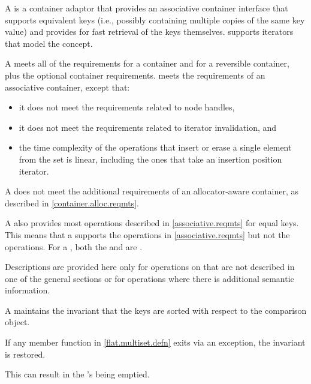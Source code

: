 \pnum
{}%
A  is a container adaptor
that provides an associative container interface
that supports equivalent keys
(i.e., possibly containing multiple copies of the same key value) and
provides for fast retrieval of the keys themselves.
 supports iterators that model the
 concept.

\pnum
A  meets all of the requirements
for a container and
for a reversible container,
plus the optional container requirements.
 meets the requirements of
an associative container, except that:
\begin{itemize}
\item
it does not meet the requirements
related to node handles,
\item
it does not meet the requirements related to iterator invalidation, and
\item
the time complexity of the operations
that insert or erase a single element from the
set is linear,
including the ones that take an insertion position iterator.
\end{itemize}
\begin{note}
A  does not meet
the additional requirements of an allocator-aware container,
as described in \ref{container.alloc.reqmts}.
\end{note}

\pnum
A  also provides most operations
described in \ref{associative.reqmts} for equal keys.
This means that a  supports
the  operations in \ref{associative.reqmts}
but not the  operations.
For a ,
both the  and  are .

\pnum
Descriptions are provided here only for operations on 
that are not described in one of the general sections or
for operations where there is additional semantic information.

\pnum
A  maintains the invariant
that the keys are sorted with respect to the comparison object.

\pnum
If any member function in \ref{flat.multiset.defn} exits via an exception,
the invariant is restored.
\begin{note}
This can result in the 's being emptied.
\end{note}

